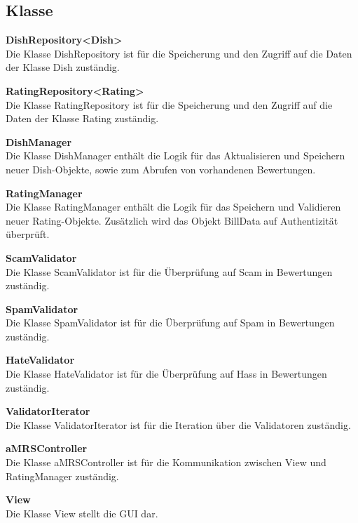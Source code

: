\subsection*{Klasse}
\noindent \textbf{DishRepository<Dish>}\\
Die Klasse DishRepository ist für die Speicherung und den Zugriff auf die Daten der Klasse Dish zuständig.
\newline

\noindent \textbf{RatingRepository<Rating>}\\
Die Klasse RatingRepository ist für die Speicherung und den Zugriff auf die Daten der Klasse Rating zuständig.
\newline

\noindent \textbf{DishManager}\\
Die Klasse DishManager enthält die Logik für das Aktualisieren und Speichern neuer Dish-Objekte, sowie zum Abrufen von
vorhandenen Bewertungen.
\newline

\noindent \textbf{RatingManager}\\
Die Klasse RatingManager enthält die Logik für das Speichern und Validieren neuer Rating-Objekte. Zusätzlich wird das
Objekt BillData auf Authentizität überprüft.
\newline

\noindent \textbf{ScamValidator}\\
Die Klasse ScamValidator ist für die Überprüfung auf Scam in Bewertungen zuständig.
\newline

\noindent \textbf{SpamValidator}\\
Die Klasse SpamValidator ist für die Überprüfung auf Spam in Bewertungen zuständig.
\newline

\noindent \textbf{HateValidator}\\
Die Klasse HateValidator ist für die Überprüfung auf Hass in Bewertungen zuständig.
\newline

\noindent \textbf{ValidatorIterator}\\
Die Klasse ValidatorIterator ist für die Iteration über die Validatoren zuständig.
\newline

\noindent \textbf{aMRSController}\\
Die Klasse aMRSController ist für die Kommunikation zwischen View und RatingManager zuständig.
\newline

\noindent \textbf{View}\\
Die Klasse View stellt die GUI dar.